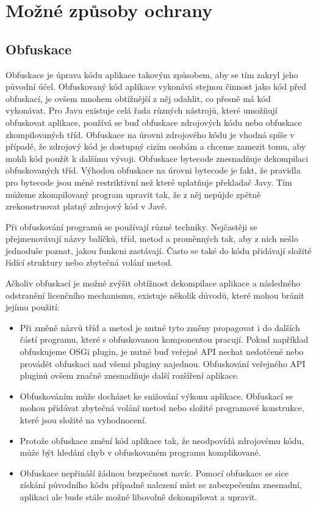 \section{Možné způsoby ochrany}

\subsection{Obfuskace}

Obfuskace je úprava kódu aplikace takovým způsobem, aby se tím zakryl jeho
původní účel. Obfuskovaný kód aplikace vykonává stejnou činnost jako kód před
obfuskací, je ovšem mnohem obtížnější z něj odahlit, co přesně má kód vykonávat.
Pro Javu existuje celá řada různých nástrojů, které umožňují obfuskovat
aplikace, používá se buď obfuskace zdrojových kódu nebo obfuskace zkompilovaných
tříd. Obfuskace na úrovni zdrojového kódu je vhodná spíše v případě, že zdrojový
kód je dostupný cizím osobám a chceme zamezit tomu, aby mohli kód použít k
dalšímu vývoji. Obfuskace bytecode znesnadňuje dekompilaci obfuskovaných tříd.
Výhodou obfuskace na úrovni bytecode je fakt, že pravidla pro bytecode jsou méně
restriktivní než které uplatňuje překladač Javy. Tím můžeme zkompilovaný program
upravit tak, že z něj nepůjde zpětně zrekonstruovat platný zdrojový kód v Javě.

Při obfuskování programů se používají různé techniky. Nejčastěji se
přejmenovávají názvy balíčků, tříd, metod a proměnných tak, aby z nich nešlo
jednoduše poznat, jakou funkcni zastávají. Často se také do kódu přidávají
složité řídící struktury nebo zbytečná volání metod.

Ačkoliv obfuskací je možné zvýšit obtížnost dekompilace aplikace a následného
odstranění licenčního mechanismu, existuje několik důvodů, které mohou bránit
jejímu použití:

\begin{itemize}
  \item Při změně názvů tříd a metod je nutné tyto změny propagovat i do dalších
  částí programu, které s obfuskovanou komponentou pracují. Pokud například
  obfuskujeme \gls{OSGi} plugin, je nutné buď veřejné \gls{API} nechat nedotčené
  nebo provádět obfuskaci nad všemi pluginy najednou. Obfuskování veřejného
  \gls{API} pluginů ovšem značně znesnadňuje další rozšíření aplikace.
  \item Obfuskováním může docházet ke snižování výkonu aplikace. Obfuskací se
  mohou přidávat zbytečná volání metod nebo složité programové konstrukce, které
  jsou složité na vyhodnocení.
  \item Protože obfuskace změní kód aplikace tak, že neodpovídá zdrojovému kódu,
  může být hledání chyb v obfuskovaném programu komplikované.
  \item Obfuskace nepřináší žádnou bezpečnost navíc. Pomocí obfuskace se sice
  získání původního kódu případně nalezení míst se zabezpečením znesnadní,
  aplikaci ale bude stále možné libovolně dekompilovat a upravit.
\end{itemize}


